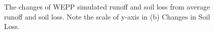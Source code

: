 \begin{figure}[htbp]
  \centering
    \qquad
  \caption[WEPP runoff and soil loss changes]{The changes of WEPP simulated
runoff and soil loss from average runoff and soil loss. Note the scale of y-axis
in (b) Changes in Soil Loss.}
  \label{fig:wepp_roff_sloss_temp_scale}
\end{figure}

